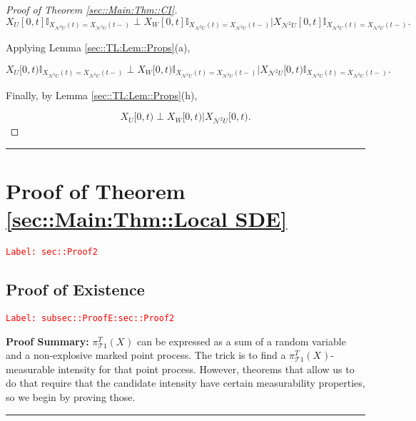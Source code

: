 \documentclass[12pt]{article}
\newcommand{\mb}{\mathbb}
\newcommand{\mc}{\mathcal}
\newcommand{\tr}{\textcolor{red}}
\newcommand{\labe}[1]{\tr{\texttt{Label: #1}}}
\newcommand{\pfsum}{\textbf{Proof Summary: }}
\newcommand{\lin}{\rule{\linewidth}{0.4 pt}}
\newcommand{\dneigh}{\mc{N}^2}				%
\renewcommand{\U}{U}							%
\newcommand{\UU}{W}								%
\newcommand{\T}{T}								%
\renewcommand{\t}{t}							%
\newcommand{\tree}{\mc{T}}							%
\newcommand{\piV}[2]{\pi_{#1}^{#2}}					%
\newcommand{\rxvt}[2]{X_{#1}{(#2)}}					%
\newcommand{\rxvts}[2]{X_{#1}{#2}}					%
\begin{document}
\begin{proof}[Proof of Theorem \ref{sec::Main:Thm::CI}]
\[\rxvts{\U}{[0,t]}\mb{I}_{\rxvt{\dneigh{\U}}{\t} = \rxvt{\dneigh{\U}}{\t-}}\perp\rxvts{\UU}{[0,t]}\mb{I}_{\rxvt{\dneigh{\U}}{\t} = \rxvt{\dneigh{\U}}{\t-}}\big|\rxvts{\dneigh{\U}}{[0,t]}\mb{I}_{\rxvt{\dneigh{\U}}{\t} = \rxvt{\dneigh{\U}}{\t-}}.\]

Applying Lemma \ref{sec::TL:Lem::Props}(a),

\[\rxvts{\U}{[0,t)}\mb{I}_{\rxvt{\dneigh{\U}}{\t} = \rxvt{\dneigh{\U}}{\t-}}\perp\rxvts{\UU}{[0,t)}\mb{I}_{\rxvt{\dneigh{\U}}{\t} = \rxvt{\dneigh{\U}}{\t-}}\big|\rxvts{\dneigh{\U}}{[0,t)}\mb{I}_{\rxvt{\dneigh{\U}}{\t} = \rxvt{\dneigh{\U}}{\t-}}.\]

Finally, by Lemma \ref{sec::TL:Lem::Props}(h),

\[\rxvts{\U}{[0,\t)}\perp\rxvts{\UU}{[0,\t)}\big|\rxvts{\dneigh{\U}}{[0,\t)}.\]
\end{proof}

\lin

\section{Proof of Theorem \ref{sec::Main:Thm::Local SDE}}
\label{sec::Proof2}\labe{sec::Proof2}

\subsection{Proof of Existence}
\label{subsec::ProofE:sec::Proof2}\labe{subsec::ProofE:sec::Proof2}

\pfsum \(\piV{\tree{1}}{\T}(\rxvts{}{})\) can be expressed as a sum of a random variable and a non-explosive marked point process. The trick is to find a \(\piV{\tree{1}}{\T}(\rxvts{}{})\)-measurable intensity for that point process. However, theorems that allow us to do that require that the candidate intensity have certain measurability properties, so we begin by proving those.

\lin
\end{document}
